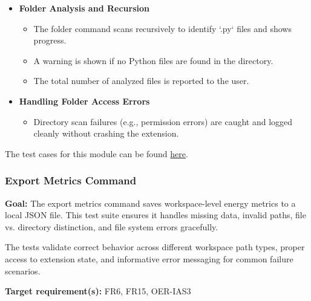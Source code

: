 \documentclass[12pt, titlepage]{article}
\begin{document}
\begin{itemize}
  \item \textbf{Folder Analysis and Recursion}
    \begin{itemize}
      \item The folder command scans recursively to identify `.py` files and shows progress.
      \item A warning is shown if no Python files are found in the directory.
      \item The total number of analyzed files is reported to the user.
    \end{itemize}

  \item \textbf{Handling Folder Access Errors}
    \begin{itemize}
      \item Directory scan failures (e.g., permission errors) are caught and logged cleanly without crashing the extension.
    \end{itemize}
\end{itemize}

\noindent The test cases for this module can be found
\href{https://github.com/ssm-lab/capstone--sco-vs-code-plugin/blob/plugin-multi-file/test/detection.test.ts}{here}.

\subsubsection{Export Metrics Command}

\textbf{Goal:} The export metrics command saves workspace-level energy metrics to a local JSON file. This test suite ensures it handles missing data, invalid paths, file vs. directory distinction, and file system errors gracefully.

\medskip

\noindent The tests validate correct behavior across different workspace path types, proper access to extension state, and informative error messaging for common failure scenarios.

\medskip

\noindent\textbf{Target requirement(s):} FR6, FR15, OER-IAS3~\cite{SRS} \\
\end{document}
